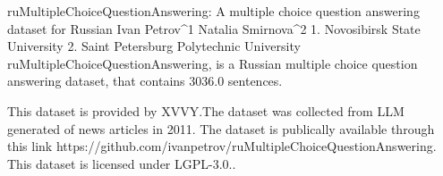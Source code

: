 
ruMultipleChoiceQuestionAnswering: A multiple choice question answering dataset for Russian
Ivan Petrov^1 Natalia Smirnova^2
1. Novosibirsk State University 2. Saint Petersburg Polytechnic University
ruMultipleChoiceQuestionAnswering, is a Russian multiple choice question answering dataset, that contains 3036.0 sentences.

This dataset is provided by XVVY.The dataset was collected from LLM generated of news articles in 2011. 
The dataset is publically available through this link https://github.com/ivanpetrov/ruMultipleChoiceQuestionAnswering. This dataset is licensed under LGPL-3.0..

